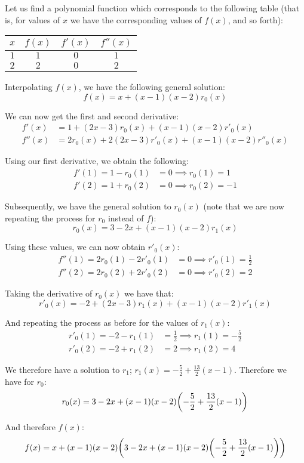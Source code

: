 \begin{example}
    Let us find a polynomial function which corresponds to the following table (that is, for values of $x$ we have the corresponding values of $f(x)$, and so forth):

    \par{}

    \begin{center}
        \begin{tabular}{c|ccc}
            $x$ & $f(x)$ & $f'(x)$ & $f''(x)$ \\
            \hline
            $1$ & $1$ & $0$ & $1$ \\
            $2$ & $2$ & $0$ & $2$
        \end{tabular}
    \end{center}

    Interpolating $f(x)$, we have the following general solution:
    $$
        f(x) = x + (x-1)(x-2)r_0(x)
    $$

    We can now get the first and second derivative:
    \begin{align*}
        f'(x) &= 1 + (2x-3)r_0(x) + (x-1)(x-2)r'_0(x) \\
        f''(x) &= 2r_0(x) + 2(2x-3)r'_0(x) + (x-1)(x-2)r''_0(x)
    \end{align*}

    Using our first derivative, we obtain the following:
    \begin{align*}
        f'(1) = 1 - r_0(1) &= 0 \implies r_0(1) = 1 \\
        f'(2) = 1 + r_0(2) &= 0 \implies r_0(2) = -1
    \end{align*}

    Subsequently, we have the general solution to $r_0(x)$ (note that we are now repeating the process for $r_0$ instead of $f$):
    $$
        r_0(x) = 3-2x + (x-1)(x-2)r_1(x)
    $$

    Using these values, we can now obtain $r'_0(x)$:
    \begin{align*}
        f''(1) = 2r_0(1) - 2r'_0(1) &= 0 \implies r'_0(1)=\frac{1}{2} \\
        f''(2) = 2r_0(2) + 2r'_0(2) &= 0 \implies r'_0(2)=2
    \end{align*}

    Taking the derivative of $r_0(x)$ we have that:
    $$
        r'_0(x) = -2 + (2x-3)r_1(x) + (x-1)(x-2)r'_1(x)
    $$

    And repeating the process as before for the values of $r_1(x)$:
    \begin{align*}
        r'_0(1) = -2 - r_1(1) &= \frac{1}{2} \implies r_1(1) = -\frac{5}{2} \\
        r'_0(2) = -2 + r_1(2) &= 2 \implies r_1(2) = 4
    \end{align*}

    We therefore have a solution to $r_1$; $r_1(x)=-\frac{5}{2}+\frac{13}{2}(x-1)$. Therefore we have for $r_0$:
    $$
        r_0(x) = 3-2x + (x-1)(x-2)\paren*{-\frac{5}{2}+\frac{13}{2}(x-1)}
    $$

    And therefore $f(x)$:
    $$
        f(x) = x + (x-1)(x-2)\paren*{3-2x + (x-1)(x-2)\paren*{-\frac{5}{2}+\frac{13}{2}(x-1)}}
    $$
\end{example}

